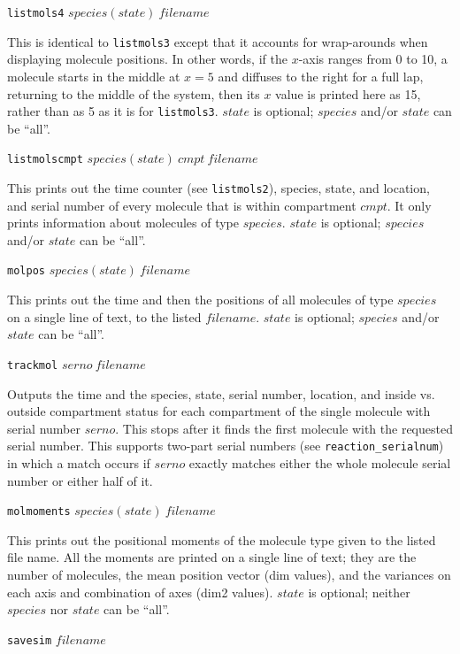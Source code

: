 \documentclass {book}
\newcommand {\ttt} {\texttt}
\begin{document}
\begin{description}
\item{\ttt{listmols4} $species(state)\ filename$}

This is identical to \ttt{listmols3} except that it accounts for wrap-arounds when displaying molecule positions. In other words, if the $x$-axis ranges from 0 to 10, a molecule starts in the middle at $x = 5$ and diffuses to the right for a full lap, returning to the middle of the system, then its $x$ value is printed here as 15, rather than as 5 as it is for \ttt{listmols3}. $state$ is optional; $species$ and/or $state$ can be ``all''.

\item{\ttt{listmolscmpt} $species(state)\ cmpt\ filename$}

This prints out the time counter (see \ttt{listmols2}), species, state, and location, and serial number of every molecule that is within compartment $cmpt$. It only prints information about molecules of type $species$. $state$ is optional; $species$ and/or $state$ can be ``all''.

\item{\ttt{molpos} $species(state)\ filename$}

This prints out the time and then the positions of all molecules of type $species$ on a single line of text, to the listed $filename$. $state$ is optional; $species$ and/or $state$ can be ``all''.

\item{\ttt{trackmol} $serno\ filename$}

Outputs the time and the species, state, serial number, location, and inside vs. outside compartment status for each compartment of the single molecule with serial number $serno$. This stops after it finds the first molecule with the requested serial number. This supports two-part serial numbers (see \ttt{reaction\_serialnum}) in which a match occurs if $serno$ exactly matches either the whole molecule serial number or either half of it.

\item{\ttt{molmoments} $species(state)\ filename$}

This prints out the positional moments of the molecule type given to the listed file name. All the moments are printed on a single line of text; they are the number of molecules, the mean position vector (dim values), and the variances on each axis and combination of axes (dim2 values). $state$ is optional; neither $species$ nor $state$ can be ``all''.

\item{\ttt{savesim} $filename$}


\end{description}
\end{document}
